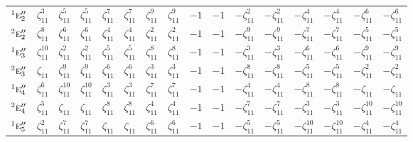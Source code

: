 \documentclass[10pt,a4paper]{article}
\numberwithin{equation}{section}
\newcommand{\irr}[1]{\text{\normalfont\scshape #1}}
\newcommand{\conjpair}[1]{{}^{#1}}
\newcommand{\rootunity}[1]{\zeta_{#1}}
\begin{document}
{\begin{longtable}{@{}lccccccccccccccc@{}}
$\conjpair{1}\irr{e}_{2}''$ & $\rootunity{11}^{3}$ & $\rootunity{11}^{5}$ & $\rootunity{11}^{5}$ & $\rootunity{11}^{7}$ & $\rootunity{11}^{7}$ & $\rootunity{11}^{9}$ & $\rootunity{11}^{9}$ & $-1$ & $-1$ & $-\rootunity{11}^{2}$ & $-\rootunity{11}^{2}$ & $-\rootunity{11}^{4}$ & $-\rootunity{11}^{4}$ & $-\rootunity{11}^{6}$ & $-\rootunity{11}^{6}$\\
$\conjpair{2}\irr{e}_{2}''$ & $\rootunity{11}^{8}$ & $\rootunity{11}^{6}$ & $\rootunity{11}^{6}$ & $\rootunity{11}^{4}$ & $\rootunity{11}^{4}$ & $\rootunity{11}^{2}$ & $\rootunity{11}^{2}$ & $-1$ & $-1$ & $-\rootunity{11}^{9}$ & $-\rootunity{11}^{9}$ & $-\rootunity{11}^{7}$ & $-\rootunity{11}^{7}$ & $-\rootunity{11}^{5}$ & $-\rootunity{11}^{5}$\\
$\conjpair{1}\irr{e}_{3}''$ & $\rootunity{11}^{10}$ & $\rootunity{11}^{2}$ & $\rootunity{11}^{2}$ & $\rootunity{11}^{5}$ & $\rootunity{11}^{5}$ & $\rootunity{11}^{8}$ & $\rootunity{11}^{8}$ & $-1$ & $-1$ & $-\rootunity{11}^{3}$ & $-\rootunity{11}^{3}$ & $-\rootunity{11}^{6}$ & $-\rootunity{11}^{6}$ & $-\rootunity{11}^{9}$ & $-\rootunity{11}^{9}$\\
$\conjpair{2}\irr{e}_{3}''$ & $\rootunity{11}$ & $\rootunity{11}^{9}$ & $\rootunity{11}^{9}$ & $\rootunity{11}^{6}$ & $\rootunity{11}^{6}$ & $\rootunity{11}^{3}$ & $\rootunity{11}^{3}$ & $-1$ & $-1$ & $-\rootunity{11}^{8}$ & $-\rootunity{11}^{8}$ & $-\rootunity{11}^{5}$ & $-\rootunity{11}^{5}$ & $-\rootunity{11}^{2}$ & $-\rootunity{11}^{2}$\\
$\conjpair{1}\irr{e}_{4}''$ & $\rootunity{11}^{6}$ & $\rootunity{11}^{10}$ & $\rootunity{11}^{10}$ & $\rootunity{11}^{3}$ & $\rootunity{11}^{3}$ & $\rootunity{11}^{7}$ & $\rootunity{11}^{7}$ & $-1$ & $-1$ & $-\rootunity{11}^{4}$ & $-\rootunity{11}^{4}$ & $-\rootunity{11}^{8}$ & $-\rootunity{11}^{8}$ & $-\rootunity{11}$ & $-\rootunity{11}$\\
$\conjpair{2}\irr{e}_{4}''$ & $\rootunity{11}^{5}$ & $\rootunity{11}$ & $\rootunity{11}$ & $\rootunity{11}^{8}$ & $\rootunity{11}^{8}$ & $\rootunity{11}^{4}$ & $\rootunity{11}^{4}$ & $-1$ & $-1$ & $-\rootunity{11}^{7}$ & $-\rootunity{11}^{7}$ & $-\rootunity{11}^{3}$ & $-\rootunity{11}^{3}$ & $-\rootunity{11}^{10}$ & $-\rootunity{11}^{10}$\\
$\conjpair{1}\irr{e}_{5}''$ & $\rootunity{11}^{2}$ & $\rootunity{11}^{7}$ & $\rootunity{11}^{7}$ & $\rootunity{11}$ & $\rootunity{11}$ & $\rootunity{11}^{6}$ & $\rootunity{11}^{6}$ & $-1$ & $-1$ & $-\rootunity{11}^{5}$ & $-\rootunity{11}^{5}$ & $-\rootunity{11}^{10}$ & $-\rootunity{11}^{10}$ & $-\rootunity{11}^{4}$ & $-\rootunity{11}^{4}$\\

\end{longtable}}
\end{document}
